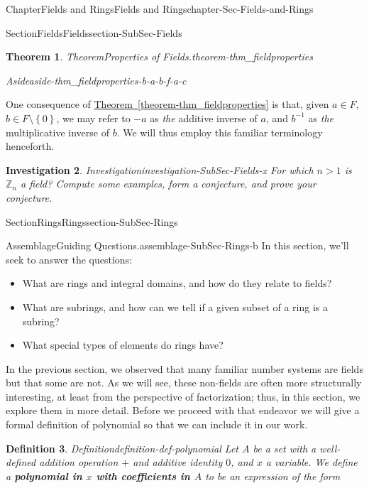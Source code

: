 \documentclass[oneside,10pt,]{book}
\newcommand{\xreffont}{\relax}
\newcommand{\terminology}[1]{\textbf{#1}}
\numberwithin{equation}{section}
\newcommand{\set}[1]{\left\{ {#1} \right\}}
\def\Z{{\mathbb Z}}
\newtheorem{theorem}{Theorem}[section]
\newtheorem{definition}[theorem]{Definition}
\newtheorem{investigation}[theorem]{Investigation}
\begin{document}
\begin{chapterptx}{Chapter}{Fields and Rings}{}{Fields and Rings}{}{}{chapter-Sec-Fields-and-Rings}
\begin{sectionptx}{Section}{Fields}{}{Fields}{}{}{section-SubSec-Fields}
\begin{theorem}{Theorem}{Properties of Fields.}{}{theorem-thm_fieldproperties}
\begin{enumerate}
\begin{aside}{Aside}{}{aside-thm_fieldproperties-b-a-b-f-a-c}%
\end{aside}
%
\end{enumerate}
%
\end{theorem}
One consequence of \hyperref[theorem-thm_fieldproperties]{Theorem~{\xreffont\ref{theorem-thm_fieldproperties}}} is that, given \(a\in F\), \(b\in F\setminus \set{0}\), we may refer to \(-a\) as \emph{the} additive inverse of \(a\), and \(b^{-1}\) as \emph{the} multiplicative inverse of \(b\). We will thus employ this familiar terminology henceforth.%
\begin{investigation}{Investigation}{}{investigation-SubSec-Fields-x}%
For which \(n > 1\) is \(\Z_n\) a field? Compute some examples, form a conjecture, and prove your conjecture.%
\end{investigation}%
\end{sectionptx}
%
%
\typeout{************************************************}
\typeout{************************************************}
%
\begin{sectionptx}{Section}{Rings}{}{Rings}{}{}{section-SubSec-Rings}
\begin{assemblage}{Assemblage}{Guiding Questions.}{assemblage-SubSec-Rings-b}%
In this section, we'll seek to answer the questions: %
\begin{itemize}[label=\textbullet]
\item{}What are rings and integral domains, and how do they relate to fields?%
\item{}What are subrings, and how can we tell if a given subset of a ring is a subring?%
\item{}What special types of elements do rings have?%
\end{itemize}
%
\end{assemblage}
In the previous section, we observed that many familiar number systems are fields but that some are not. As we will see, these non-fields are often more structurally interesting, at least from the perspective of factorization; thus, in this section, we explore them in more detail. Before we proceed with that endeavor we will give a formal definition of polynomial so that we can include it in our work.%
\begin{definition}{Definition}{}{definition-def-polynomial}%
Let \(A\) be a set with a well-defined addition operation \(+\) and additive identity \(0\), and \(x\) a variable. We define a \terminology{polynomial in \(x\) with coefficients in \(A\)} to be an expression of the form%

\end{definition}
\end{sectionptx}
\end{chapterptx}
\end{document}
